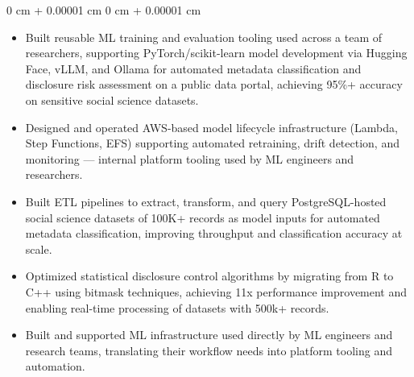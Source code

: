 \documentclass[6pt, letterpaper]{article}
\newenvironment{highlights}{
    \begin{itemize}[
        topsep=0.03 cm,
        parsep=0.03 cm,
        partopsep=0pt,
        itemsep=0pt,
        leftmargin=0 cm + 10pt
    ]
}{
    \end{itemize}
} %
\newenvironment{onecolentry}{
    \begin{adjustwidth}{
        0 cm + 0.00001 cm
    }{
        0 cm + 0.00001 cm
    }
}{
    \end{adjustwidth}
} %
\begin{document}
        \begin{onecolentry}
        \begin{highlights}

            \item Built reusable ML training and evaluation tooling used across a team of researchers, supporting PyTorch/scikit-learn model development via Hugging Face, vLLM, and Ollama for automated metadata classification and disclosure risk assessment on a public data portal, achieving 95\%+ accuracy on sensitive social science datasets.
            \item Designed and operated AWS-based model lifecycle infrastructure (Lambda, Step Functions, EFS) supporting automated retraining, drift detection, and monitoring — internal platform tooling used by ML engineers and researchers.
            \item Built ETL pipelines to extract, transform, and query PostgreSQL-hosted social science datasets of 100K+ records as model inputs for automated metadata classification, improving throughput and classification accuracy at scale.
            \item Optimized statistical disclosure control algorithms by migrating from R to C++ using bitmask techniques, achieving 11x performance improvement and enabling real-time processing of datasets with 500k+ records.
            \item Built and supported ML infrastructure used directly by ML engineers and research teams, translating their workflow needs into platform tooling and automation.

        \end{highlights}
        \end{onecolentry}
\end{document}
